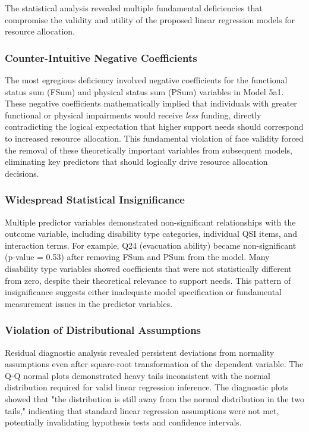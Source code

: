 The statistical analysis revealed multiple fundamental deficiencies that compromise the validity and utility of the proposed linear regression models for resource allocation.

\subsubsection{Counter-Intuitive Negative Coefficients}

The most egregious deficiency involved negative coefficients for the functional status sum (FSum) and physical status sum (PSum) variables in Model 5a1. These negative coefficients mathematically implied that individuals with greater functional or physical impairments would receive \textit{less} funding, directly contradicting the logical expectation that higher support needs should correspond to increased resource allocation. This fundamental violation of face validity forced the removal of these theoretically important variables from subsequent models, eliminating key predictors that should logically drive resource allocation decisions.

\subsubsection{Widespread Statistical Insignificance}

Multiple predictor variables demonstrated non-significant relationships with the outcome variable, including disability type categories, individual QSI items, and interaction terms. For example, Q24 (evacuation ability) became non-significant (p-value = 0.53) after removing FSum and PSum from the model. Many disability type variables showed coefficients that were not statistically different from zero, despite their theoretical relevance to support needs. This pattern of insignificance suggests either inadequate model specification or fundamental measurement issues in the predictor variables.

\subsubsection{Violation of Distributional Assumptions}

Residual diagnostic analysis revealed persistent deviations from normality assumptions even after square-root transformation of the dependent variable. The Q-Q normal plots demonstrated heavy tails inconsistent with the normal distribution required for valid linear regression inference. The diagnostic plots showed that "the distribution is still away from the normal distribution in the two tails," indicating that standard linear regression assumptions were not met, potentially invalidating hypothesis tests and confidence intervals.

